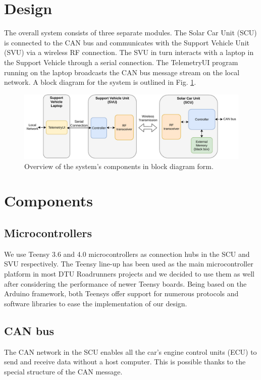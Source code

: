 \documentclass[a4paper,conference]{IEEEtran}
\begin{document}
\section{Design}
The overall system consists of three separate modules. The Solar Car Unit (SCU) is connected to the CAN bus and communicates with the Support Vehicle Unit (SVU) via a wireless RF connection. The SVU in turn interacts with a laptop in the Support Vehicle through a serial connection. The TelemetryUI program running on the laptop broadcasts the CAN bus message stream on the local network. A block diagram for the system is outlined in Fig. \ref{fig:schematic}. 
\begin{figure}
    \centering
    \includegraphics[width=\linewidth]{documentation/images/SystemSchematic.pdf}
    \caption{Overview of the system's components in block diagram form.}
    \label{fig:schematic}
\end{figure}

\section{Components}

\subsection{Microcontrollers} %
We use Teensy 3.6 and 4.0 microcontrollers as connection hubs in the SCU and SVU respectively. The Teensy line-up has been used as the main microcontroller platform in most DTU Roadrunners projects and we decided to use them as well after considering the performance of newer Teensy boards. Being based on the Arduino framework, both Teensys offer support for numerous protocols and software libraries to ease the implementation of our design. 

\subsection{CAN bus}
The CAN network in the SCU enables all the car's engine control units (ECU) to send and receive data without a host computer. This is possible thanks to the special structure of the CAN message.
\end{document}
